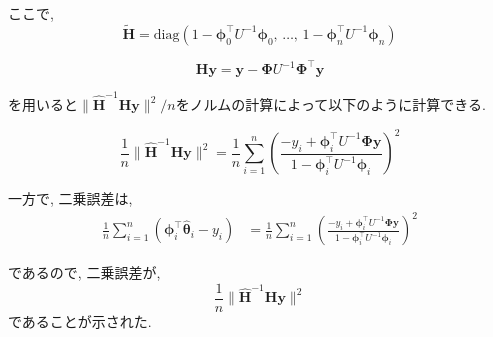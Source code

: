 \documentclass[a4paper,11pt]{jsarticle}
\begin{document}
  ここで, 
  \[ \tilde{\bm H} = \text{diag}(1-{\bm \phi}_0^\top U^{-1} {\bm \phi}_0, \, \dots, \, 1-{\bm \phi}_n^\top U^{-1} {\bm \phi}_n )\]

  \[{\bm H}{\bm y} = {\bm y} - {\bm \Phi} U^{-1}{\bm \Phi}^\top{\bm y} \]

  を用いると$\|\hat{\bm H}^{-1} {\bm H} {\bm y}\|^2/n$をノルムの計算によって以下のように計算できる.

  \[ \frac{1}{n} \|\hat{\bm H}^{-1} {\bm H} {\bm y}\|^2 = \frac{1}{n} \sum _{i=1} ^{n} \left( \frac{-y_i + {\bm \phi}_i^\top U^{-1}{\bm \Phi}{\bm y}}{1-{\bm \phi}_i ^\top U ^{-1} {\bm \phi}_i} \right) ^2\]

  一方で, 二乗誤差は, 
  \begin{align*}
    \frac{1}{n}\sum _{i=1}^{n} ({\bm \phi}_i^\top\hat{\bm \theta}_i - y_i) &= \frac{1}{n} \sum _{i=1} ^{n} \left( \frac{-y_i + {\bm \phi}_i^\top U^{-1}{\bm \Phi}{\bm y}}{1-{\bm \phi}_i ^\top U ^{-1} {\bm \phi}_i} \right) ^2
  \end{align*}

  であるので, 二乗誤差が, 
  \[ \frac{1}{n} \|\hat{\bm H}^{-1} {\bm H} {\bm y}\|^2\]
  であることが示された.
  
\end{document}
